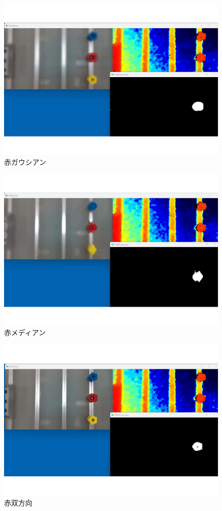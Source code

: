 \begin{figure}[H]
  \centering
  \includegraphics[scale=0.5]{sozai/c.pdf}
  \caption{赤ガウシアン}
\end{figure}

\begin{figure}[H]
  \centering
  \includegraphics[scale=0.5]{sozai/d.pdf}
  \caption{赤メディアン}
\end{figure}

\begin{figure}[H]
  \centering
  \includegraphics[scale=0.5]{sozai/e.pdf}
  \caption{赤双方向}
\end{figure}



